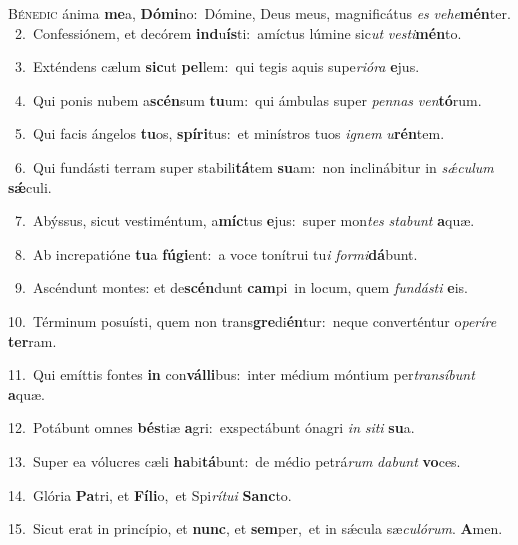 \lettrine{\initial\textcolor{\initialcolor}{B}}{énedic} ánima \textbf{me}\-a, \textbf{Dó}\-\textbf{mi}no:~\star Dómine, Deus meus, magnificátus \textit{es} \textit{ve}\-\textit{he}\textbf{mén}ter.\\
{\numbfont\textcolor{\numbcolor}{~2.}}~Confessiónem, et decórem \textbf{ind}\-u\-\textbf{ís}\-ti:~\star amíctus lúmine sic\textit{ut} \textit{ves}\-\textit{ti}\textbf{mén}to.\par
{\numbfont\textcolor{\numbcolor}{~3.}}~Exténdens cælum \textbf{sic}\-ut \textbf{pel}\-lem:~\star qui tegis aquis supe\-\textit{ri}\-\textit{ó}\textit{ra} \textbf{e}\-jus.\par
{\numbfont\textcolor{\numbcolor}{~4.}}~Qui ponis nubem a\-\textbf{scén}\-sum \textbf{tu}\-um:~\star qui ámbulas super \textit{pen}\-\textit{nas} \textit{ven}\-\textbf{tó}rum.\par
{\numbfont\textcolor{\numbcolor}{~5.}}~Qui facis ángelos \textbf{tu}\-os, \textbf{spí}\-\textbf{ri}tus:~\star et minístros tuos \textit{i}\-\textit{gnem} \textit{u}\-\textbf{rén}tem.\par
{\numbfont\textcolor{\numbcolor}{~6.}}~Qui fundásti terram super stabili\-\textbf{tá}\-tem \textbf{su}\-am:~\star non inclinábitur in \textit{sǽ}\-\textit{cu}\textit{lum} \textbf{sǽ}\-culi.\par
{\numbfont\textcolor{\numbcolor}{~7.}}~Abýssus, sicut vestiméntum, a\-\textbf{míc}\-tus \textbf{e}\-jus:~\star super mon\textit{tes} \textit{sta}\-\textit{bunt} \textbf{a}\-quæ.\par
{\numbfont\textcolor{\numbcolor}{~8.}}~Ab increpatióne \textbf{tu}\-a \textbf{fú}\-\textbf{gi}ent:~\star a voce tonítrui tu\textit{i} \textit{for}\-\textit{mi}\textbf{dá}bunt.\par
{\numbfont\textcolor{\numbcolor}{~9.}}~Ascéndunt montes: et de\-\textbf{scén}\-dunt \textbf{cam}\-pi~\star in locum, quem \textit{fun}\-\textit{dás}\textit{ti} \textbf{e}\-is.\par
{\numbfont\textcolor{\numbcolor}{10.}}~Términum posuísti, quem non trans\-\textbf{gre}\-di\-\textbf{én}\-tur:~\star neque converténtur o\-\textit{pe}\-\textit{rí}\textit{re} \textbf{ter}\-ram.\par
{\numbfont\textcolor{\numbcolor}{11.}}~Qui emíttis fontes \textbf{in} con\-\textbf{vál}\-\textbf{li}bus:~\star inter médium móntium per\-\textit{trans}\-\textit{í}\textit{bunt} \textbf{a}\-quæ.\par
{\numbfont\textcolor{\numbcolor}{12.}}~Potábunt omnes \textbf{bés}\-tiæ \textbf{a}\-gri:~\star exspectábunt ónagri \textit{in} \textit{si}\-\textit{ti} \textbf{su}\-a.\par
{\numbfont\textcolor{\numbcolor}{13.}}~Super ea vólucres cæli \textbf{ha}\-bi\-\textbf{tá}\-bunt:~\star de médio petrá\textit{rum} \textit{da}\-\textit{bunt} \textbf{vo}\-ces.\par
{\numbfont\textcolor{\numbcolor}{14.}}~Glória \textbf{Pa}\-tri, et \textbf{Fí}\-\textbf{li}o,~\star et Spi\-\textit{rí}\-\textit{tu}\textit{i} \textbf{Sanc}\-to.\par
{\numbfont\textcolor{\numbcolor}{15.}}~Sicut erat in princípio, et \textbf{nunc}\-, et \textbf{sem}\-per,~\star et in sǽcula sæ\-\textit{cu}\-\textit{ló}\textit{rum}. \textbf{A}\-men.\par

